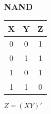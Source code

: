 \documentclass{article}
\begin{document}
    \begin{multicols}{2}

        \begin{center}

            \subsubsection*{NAND}
            \vspace{1em}
            \begin{tabular}{cc|c}
                X \hspace{1em} & Y \hspace{1em} & \hspace{1em}Z \\
                \hline
                0 \hspace{1em} & 0 \hspace{1em} & \hspace{1em}1 \\
                0 \hspace{1em} & 1 \hspace{1em} & \hspace{1em}1 \\
                1 \hspace{1em} & 0 \hspace{1em} & \hspace{1em}1 \\
                1 \hspace{1em} & 1 \hspace{1em} & \hspace{1em}0 \\
            \end{tabular}

            \vspace{2em}
            $Z = (XY)'$

            \vspace{4em}

\end{center}
\end{multicols}
\end{document}
